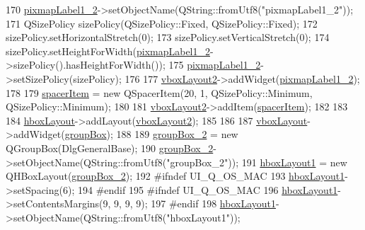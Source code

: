 \begin{DoxyCode}
170         \hyperlink{classUi__DlgGeneralBase_ad5978e3e0b3caa214086a2dfa6e10a4f}{pixmapLabel1\_2}->setObjectName(QString::fromUtf8(\textcolor{stringliteral}{"pixmapLabel1\_2"}));
171         QSizePolicy sizePolicy(QSizePolicy::Fixed, QSizePolicy::Fixed);
172         sizePolicy.setHorizontalStretch(0);
173         sizePolicy.setVerticalStretch(0);
174         sizePolicy.setHeightForWidth(\hyperlink{classUi__DlgGeneralBase_ad5978e3e0b3caa214086a2dfa6e10a4f}{pixmapLabel1\_2}->sizePolicy().hasHeightForWidth());
175         \hyperlink{classUi__DlgGeneralBase_ad5978e3e0b3caa214086a2dfa6e10a4f}{pixmapLabel1\_2}->setSizePolicy(sizePolicy);
176 
177         \hyperlink{classUi__DlgGeneralBase_aae73c98ee62ac66deae57632a9d82a4c}{vboxLayout2}->addWidget(\hyperlink{classUi__DlgGeneralBase_ad5978e3e0b3caa214086a2dfa6e10a4f}{pixmapLabel1\_2});
178 
179         \hyperlink{classUi__DlgGeneralBase_ac1694bcde138dc57b7fd0a63e778ccc2}{spacerItem} = \textcolor{keyword}{new} QSpacerItem(20, 1, QSizePolicy::Minimum, QSizePolicy::Minimum);
180 
181         \hyperlink{classUi__DlgGeneralBase_aae73c98ee62ac66deae57632a9d82a4c}{vboxLayout2}->addItem(\hyperlink{classUi__DlgGeneralBase_ac1694bcde138dc57b7fd0a63e778ccc2}{spacerItem});
182 
183 
184         \hyperlink{classUi__DlgGeneralBase_a43bdd775726703c8af00b360880cd7a9}{hboxLayout}->addLayout(\hyperlink{classUi__DlgGeneralBase_aae73c98ee62ac66deae57632a9d82a4c}{vboxLayout2});
185 
186 
187         \hyperlink{classUi__DlgGeneralBase_ad85268c43c0919c56230704be03f092c}{vboxLayout}->addWidget(\hyperlink{classUi__DlgGeneralBase_aa25408255cc1bc3b6d720b58ceb42e32}{groupBox});
188 
189         \hyperlink{classUi__DlgGeneralBase_ae822e688fc0f616b4a29511bc5615a3d}{groupBox\_2} = \textcolor{keyword}{new} QGroupBox(DlgGeneralBase);
190         \hyperlink{classUi__DlgGeneralBase_ae822e688fc0f616b4a29511bc5615a3d}{groupBox\_2}->setObjectName(QString::fromUtf8(\textcolor{stringliteral}{"groupBox\_2"}));
191         \hyperlink{classUi__DlgGeneralBase_a2db865b00918e93123eb63bf71b083d2}{hboxLayout1} = \textcolor{keyword}{new} QHBoxLayout(\hyperlink{classUi__DlgGeneralBase_ae822e688fc0f616b4a29511bc5615a3d}{groupBox\_2});
192 \textcolor{preprocessor}{#ifndef UI\_Q\_OS\_MAC}
193         \hyperlink{classUi__DlgGeneralBase_a2db865b00918e93123eb63bf71b083d2}{hboxLayout1}->setSpacing(6);
194 \textcolor{preprocessor}{#endif}
195 \textcolor{preprocessor}{#ifndef UI\_Q\_OS\_MAC}
196         \hyperlink{classUi__DlgGeneralBase_a2db865b00918e93123eb63bf71b083d2}{hboxLayout1}->setContentsMargins(9, 9, 9, 9);
197 \textcolor{preprocessor}{#endif}
198         \hyperlink{classUi__DlgGeneralBase_a2db865b00918e93123eb63bf71b083d2}{hboxLayout1}->setObjectName(QString::fromUtf8(\textcolor{stringliteral}{"hboxLayout1"}));

\end{DoxyCode}
